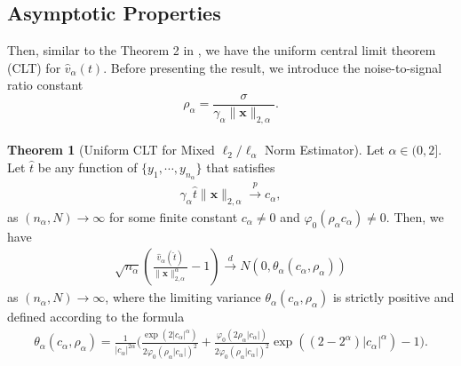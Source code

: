 \documentclass[journal,onecolumn]{IEEEtran}
\begin{document}
\subsection{Asymptotic Properties}
Then, similar to the Theorem 2 in \cite{l2}, we have the uniform central limit theorem (CLT) \cite{du} for $\hat{v}_\alpha(t)$. Before presenting the result, we introduce the noise-to-signal ratio constant $$
\rho_\alpha=\frac{\sigma}{\gamma_\alpha\lVert\mathbf{x}\rVert_{2,\alpha}}.
$$\\
\noindent
{\bf Theorem 1} (Uniform CLT for Mixed $\ell_2/\ell_{\alpha}$ Norm Estimator). Let $\alpha\in(0,2]$. Let $\hat{t}$ be any function of $\{y_1,\cdots,y_{n_\alpha}\}$ that satisfies \begin{align}
\gamma_\alpha\hat{t}\lVert \mathbf{x}\rVert_{2,\alpha}\overset{p}\longrightarrow c_\alpha,
\end{align}
as $(n_\alpha,N)\rightarrow \infty$ for some finite constant $c_\alpha\neq 0$ and $\varphi_0(\rho_\alpha c_\alpha)\neq 0$. Then, we have \begin{align}
\sqrt{n_\alpha}\left(\frac{\hat{v}_{\alpha}(\hat{t})}{\lVert\mathbf{x}\rVert_{2,\alpha}^{\alpha}}-1\right)\overset{d}\longrightarrow N(0,\theta_\alpha(c_\alpha,\rho_\alpha))
\end{align}
as $(n_{\alpha},N)\rightarrow\infty$, where the limiting variance $\theta_\alpha(c_\alpha,\rho_\alpha)$ is strictly positive and defined according to the formula \begin{align}
\theta_\alpha(c_\alpha,\rho_\alpha)=\frac{1}{|c_\alpha|^{2\alpha}}\Big(\frac{\exp(2|c_\alpha|^{\alpha})}{2\varphi_0(\rho_\alpha
	|c_\alpha|)^2}+\frac{\varphi_0(2\rho_\alpha|c_\alpha|)}{2\varphi_0(\rho_\alpha|c_\alpha|)^2}\exp((2-2^\alpha)|c_\alpha|^\alpha)-1\Big).
\end{align}
\\
\end{document}

